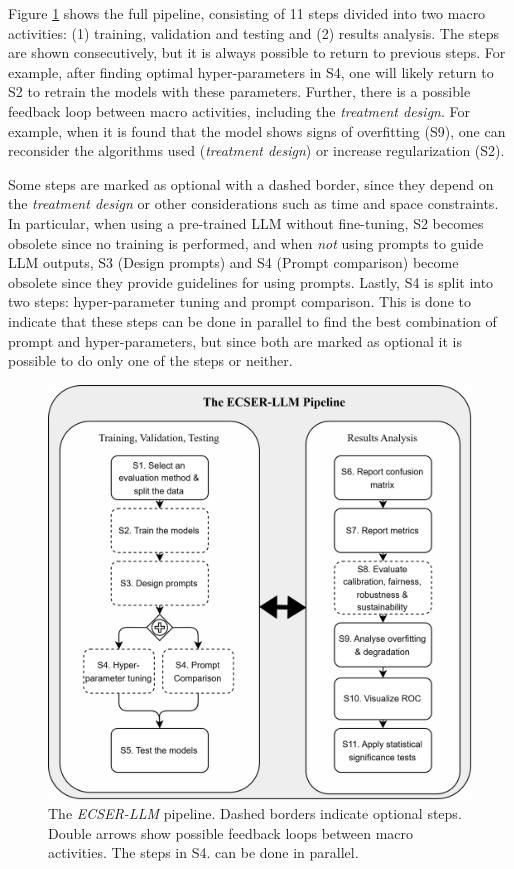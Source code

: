 \documentclass[a4paper]{article}
\newcommand{\newecser}{\textit{ECSER-LLM} }
\begin{document}
Figure \ref{fig:ECSER-LLM} shows the full pipeline, consisting of 11 steps divided into two macro activities: (1) training, validation and testing and (2) results analysis. The steps are shown consecutively, but it is always possible to return to previous steps. For example, after finding optimal hyper-parameters in S4, one will likely return to S2 to retrain the models with these parameters. Further, there is a possible feedback loop between macro activities, including the \textit{treatment design}. For example, when it is found that the model shows signs of overfitting (S9), one can reconsider the algorithms used (\textit{treatment design}) or increase regularization (S2).

Some steps are marked as optional with a dashed border, since they depend on the \textit{treatment design} or other considerations such as time and space constraints. In particular, when using a pre-trained LLM without fine-tuning, S2 becomes obsolete since no training is performed, and when \textit{not} using prompts to guide LLM outputs, S3 (Design prompts) and S4 (Prompt comparison) become obsolete since they provide guidelines for using prompts. Lastly, S4 is split into two steps: hyper-parameter tuning and prompt comparison. This is done to indicate that these steps can be done in parallel to find the best combination of prompt and hyper-parameters, but since both are marked as optional it is possible to do only one of the steps or neither. 

\begin{figure}[H]
	\centering
	\captionsetup{justification=centering}
	\includegraphics[width=1\linewidth]{figures/ECSER-LLM.png}
	\caption{The \newecser pipeline. Dashed borders indicate optional steps. Double arrows show possible feedback loops between macro activities. The steps in S4. can be done in parallel.}
	\label{fig:ECSER-LLM}
\end{figure}
\end{document}
